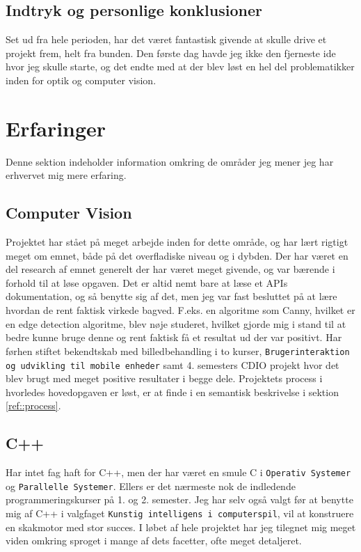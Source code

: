 \subsection{Indtryk og personlige konklusioner}
Set ud fra hele perioden, har det været fantastisk givende at skulle drive et projekt frem, helt fra bunden. Den første dag havde jeg ikke den fjerneste ide hvor jeg skulle starte, og det endte med at der blev løst en hel del problematikker inden for optik og computer vision.

\section{Erfaringer}
Denne sektion indeholder information omkring de områder jeg mener jeg har erhvervet mig mere erfaring.

\subsection{Computer Vision}
Projektet har stået på meget arbejde inden for dette område, og har lært rigtigt meget om emnet, både på det overfladiske niveau og i dybden. Der har været en del research af emnet generelt der har været meget givende, og var bærende i forhold til at løse opgaven. Det er altid nemt bare at læse et APIs dokumentation, og så benytte sig af det, men jeg var fast besluttet på at lære hvordan de rent faktisk virkede bagved. F.eks. en algoritme som Canny, hvilket er en edge detection algoritme, blev nøje studeret, hvilket gjorde mig i stand til at bedre kunne bruge denne og rent faktisk få et resultat ud der var positivt.
Har førhen stiftet bekendtskab med billedbehandling i to kurser, \texttt{Brugerinteraktion og udvikling til mobile enheder} samt 4. semesters CDIO projekt hvor det blev brugt med meget positive resultater i begge dele.
Projektets process i hvorledes hovedopgaven er løst, er at finde i en semantisk beskrivelse i sektion \ref{ref::process}.

\subsection{C++}
Har intet fag haft for C++, men der har været en smule C i \texttt{Operativ Systemer} og \texttt{Parallelle Systemer}. Ellers er det nærmeste nok de indledende programmeringskurser på 1. og 2. semester. Jeg har selv også valgt før at benytte mig af C++ i valgfaget \texttt{Kunstig intelligens i computerspil}, vil at konstruere en skakmotor med stor succes.
I løbet af hele projektet har jeg tilegnet mig meget viden omkring sproget i mange af dets facetter, ofte meget detaljeret.
